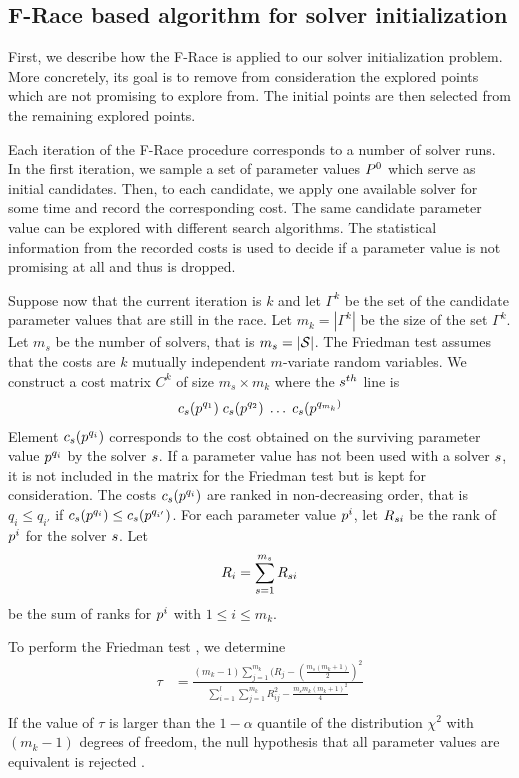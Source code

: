 \subsection{F-Race based algorithm for solver initialization}

First, we describe how the F-Race is applied to our solver initialization problem. More concretely, its goal is to remove from consideration the explored points which are not promising to explore from. The initial points are then selected from the remaining explored points.

Each iteration of the F-Race procedure corresponds to a number of solver runs. In the first iteration, we sample a set of parameter values $P^0$ which serve as initial candidates. Then, to each candidate, we apply one available solver for some time and record the corresponding cost. The same candidate parameter value can be explored with different search algorithms. The statistical information from the recorded costs is used to decide if a parameter value is not promising at all and thus is dropped. 

Suppose now that the current iteration is $k$ and let $\Gamma^k$ be the set of the candidate parameter values that are still in the race. Let $m_k = | \Gamma^k | $ be the size of the set $\Gamma^k$. Let $m_s$ be the number of solvers, that is $m_s = | \mathcal{S} |$. The Friedman test assumes that the costs are $k$ mutually independent $m$-variate random variables. We construct a cost matrix $C^k$ of size $m_s \times m_k$ where the $s^{th}$ line is
\begin{eqnarray}\label{eq:C}
c_{s}(p^{q_1})  \; c_{s}(p^{q_2}) \; \ldots  \; c_{s}(p^{q_{m_k})} 
\end{eqnarray}
Element $c_{s}(p^{q_i})$ corresponds to the cost obtained on the surviving parameter value $p^{q_i}$ by the solver $s$. If a parameter value has not been used with a solver $s$, it is not included in the matrix for the Friedman test but is kept for consideration. The costs $c_{s}(p^{q_i})$ are ranked in non-decreasing order, that is $q_i \le q_{i'}$ if $c_{s}(p^{q_i}) \le c_{s}(p^{q_{i'}})$. For each parameter value $p^i$, let $R_{s i}$ be the rank of $p^i$ for the solver $s$. Let $$R_i =  \sum_{s=1}^{m_s} R_{{s} i}$$ 
be the sum of ranks for $p^i$ with $1 \leq i \leq m_k$. 

To perform the Friedman test \cite{FRace2010}, we determine
\begin{eqnarray*}
\tau & = \displaystyle{ \frac{ (m_k-1) \sum_{j=1}^{m_k} (R_j - (\frac{m_s(m_k+1)}{2})^2 } {\sum_{i=1}^l \sum_{j=1}^{m_k}  R^2_{ij} -  \frac{m_s m_k (m_k+1)^2}{4} }} \nonumber \\ 
\end{eqnarray*}
If the value of $\tau$ is larger than the $1 - \alpha$ quantile of the distribution $\chi^2$  with $(m_k - 1)$ degrees of freedom, the null hypothesis that all parameter values are equivalent is rejected \cite{Papoulis1991}. 

